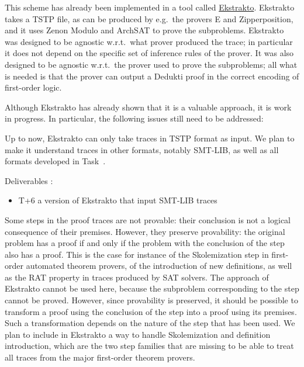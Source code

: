 \begin{workpackage}[id=atpetc,wphases=0-48,type=RTD,
  short=ATPs etc.,%
  title={ATP, SAT, SMT, Model checkers},
  lead=Lie,
  LieRM=10]
\begin{tasklist}
\begin{task}[id=tracetodedukti, title=Translate ATP traces into Dedukti]
This scheme has already been implemented in a tool called
\href{https://github.com/Deducteam/ekstrakto}{Ekstrakto}. Ekstrakto
takes a TSTP file, as can be produced by e.g.\ the provers E and
Zipperposition, and it uses Zenon Modulo and ArchSAT to prove the
subproblems. Ekstrakto was designed to be agnostic w.r.t.\ what
prover produced the trace; in particular it does not depend on the
specific set of inference rules of the prover. It was also designed to
be agnostic w.r.t.\ the prover used to prove the subproblems; all what
is needed is that the prover can output a Dedukti proof in the correct
encoding of first-order logic.

Although Ekstrakto has already shown that it is a
valuable approach, it is work in progress. In particular, the
following issues still need to be addressed:

\begin{compactenum}
\item  Up to now, Ekstrakto can only take traces in TSTP format as input. We
  plan to make it understand traces in other formats, notably SMT-LIB,
  as well as all formats developed in Task~.

  Deliverables :
  \begin{itemize}
  \item T+6 a version of Ekstrakto that input SMT-LIB traces
  \end{itemize}



\item  Some steps in the proof traces are not provable: their conclusion is
  not a logical consequence of their premises. However, they preserve
  provability: the original problem has a proof if and only if the
  problem with the conclusion of the step also has a proof. This is the
  case for instance of the Skolemization step in first-order automated
  theorem provers, of the introduction of new definitions, as well as
  the RAT property in traces produced by SAT solvers. The approach of
  Ekstrakto cannot be used here, because the subproblem corresponding to
  the step cannot be proved. However, since provability is preserved, it
  should be possible to transform a
  proof using the conclusion of the step into a proof using its
  premises. Such a transformation depends on the nature of the step that
  has been used. We plan to include in Ekstrakto a way to handle
  Skolemization and definition introduction, which are the two step
  families that are missing to be able to treat all traces from the
  major first-order theorem provers.


\end{compactenum}
\end{task}
\end{tasklist}
\end{workpackage}
